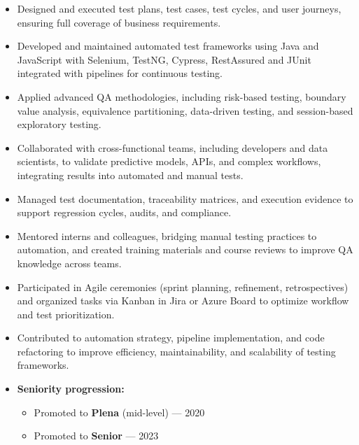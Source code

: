 
{\small
{}
\begin{itemize}
    \item Designed and executed test plans, test cases, test cycles, and user journeys, ensuring full coverage of business requirements.
    \item Developed and maintained automated test frameworks using Java and JavaScript with Selenium, TestNG, Cypress, RestAssured and JUnit integrated with pipelines for continuous testing.
    \item Applied advanced QA methodologies, including risk-based testing, boundary value analysis, equivalence partitioning, data-driven testing, and session-based exploratory testing.
    \item Collaborated with cross-functional teams, including developers and data scientists, to validate predictive models, APIs, and complex workflows, integrating results into automated and manual tests.
    \item Managed test documentation, traceability matrices, and execution evidence to support regression cycles, audits, and compliance.
    \item Mentored interns and colleagues, bridging manual testing practices to automation, and created training materials and course reviews to improve QA knowledge across teams.
    \item Participated in Agile ceremonies (sprint planning, refinement, retrospectives) and organized tasks via Kanban in Jira or Azure Board to optimize workflow and test prioritization.
    \item Contributed to automation strategy, pipeline implementation, and code refactoring to improve efficiency, maintainability, and scalability of testing frameworks.
    
    \item \textbf{Seniority progression:}
    \begin{itemize}
        \item Promoted to \textbf{Plena} (mid-level) — 2020
        \item Promoted to \textbf{Senior} — 2023
    \end{itemize}
    

\end{itemize}}
